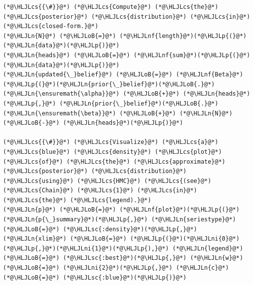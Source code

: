 \documentclass[12pt,a4paper]{article}
\newcommand{\HLJLn}[1]{#1}
\newcommand{\HLJLnf}[1]{\textcolor[RGB]{66,102,213}{#1}}
\newcommand{\HLJLsc}[1]{\textcolor[RGB]{201,61,57}{#1}}
\newcommand{\HLJLni}[1]{\textcolor[RGB]{59,151,46}{#1}}
\newcommand{\HLJLoB}[1]{\textcolor[RGB]{102,102,102}{\textbf{#1}}}
\newcommand{\HLJLp}[1]{#1}
\newcommand{\HLJLcs}[1]{\textcolor[RGB]{153,153,119}{\textit{#1}}}
\begin{document}
\begin{lstlisting}
(*@\HLJLcs{{\#}}@*) (*@\HLJLcs{Compute}@*) (*@\HLJLcs{the}@*) (*@\HLJLcs{posterior}@*) (*@\HLJLcs{distribution}@*) (*@\HLJLcs{in}@*) (*@\HLJLcs{closed-form.}@*)
(*@\HLJLn{N}@*) (*@\HLJLoB{=}@*) (*@\HLJLnf{length}@*)(*@\HLJLp{(}@*)(*@\HLJLn{data}@*)(*@\HLJLp{)}@*)
(*@\HLJLn{heads}@*) (*@\HLJLoB{=}@*) (*@\HLJLnf{sum}@*)(*@\HLJLp{(}@*)(*@\HLJLn{data}@*)(*@\HLJLp{)}@*)
(*@\HLJLn{updated{\_}belief}@*) (*@\HLJLoB{=}@*) (*@\HLJLnf{Beta}@*)(*@\HLJLp{(}@*)(*@\HLJLn{prior{\_}belief}@*)(*@\HLJLoB{.}@*)(*@\HLJLn{\ensuremath{\alpha}}@*) (*@\HLJLoB{+}@*) (*@\HLJLn{heads}@*)(*@\HLJLp{,}@*) (*@\HLJLn{prior{\_}belief}@*)(*@\HLJLoB{.}@*)(*@\HLJLn{\ensuremath{\beta}}@*) (*@\HLJLoB{+}@*) (*@\HLJLn{N}@*) (*@\HLJLoB{-}@*) (*@\HLJLn{heads}@*)(*@\HLJLp{)}@*)

(*@\HLJLcs{{\#}}@*) (*@\HLJLcs{Visualize}@*) (*@\HLJLcs{a}@*) (*@\HLJLcs{blue}@*) (*@\HLJLcs{density}@*) (*@\HLJLcs{plot}@*) (*@\HLJLcs{of}@*) (*@\HLJLcs{the}@*) (*@\HLJLcs{approximate}@*) (*@\HLJLcs{posterior}@*) (*@\HLJLcs{distribution}@*) (*@\HLJLcs{using}@*) (*@\HLJLcs{HMC}@*) (*@\HLJLcs{(see}@*) (*@\HLJLcs{Chain}@*) (*@\HLJLcs{1}@*) (*@\HLJLcs{in}@*) (*@\HLJLcs{the}@*) (*@\HLJLcs{legend).}@*)
(*@\HLJLn{p}@*) (*@\HLJLoB{=}@*) (*@\HLJLnf{plot}@*)(*@\HLJLp{(}@*)(*@\HLJLn{p{\_}summary}@*)(*@\HLJLp{,}@*) (*@\HLJLn{seriestype}@*) (*@\HLJLoB{=}@*) (*@\HLJLsc{:density}@*)(*@\HLJLp{,}@*) (*@\HLJLn{xlim}@*) (*@\HLJLoB{=}@*) (*@\HLJLp{(}@*)(*@\HLJLni{0}@*)(*@\HLJLp{,}@*)(*@\HLJLni{1}@*)(*@\HLJLp{),}@*) (*@\HLJLn{legend}@*) (*@\HLJLoB{=}@*) (*@\HLJLsc{:best}@*)(*@\HLJLp{,}@*) (*@\HLJLn{w}@*) (*@\HLJLoB{=}@*) (*@\HLJLni{2}@*)(*@\HLJLp{,}@*) (*@\HLJLn{c}@*) (*@\HLJLoB{=}@*) (*@\HLJLsc{:blue}@*)(*@\HLJLp{)}@*)


\end{lstlisting}
\end{document}
